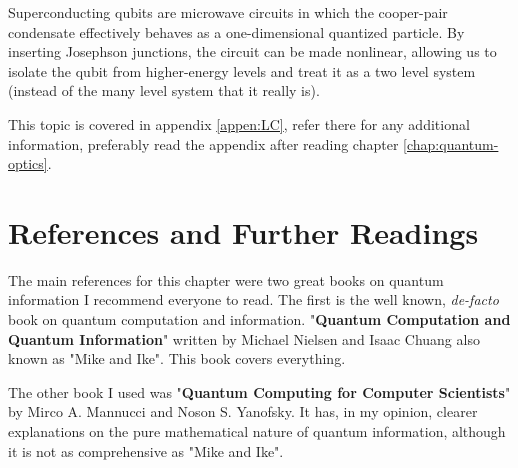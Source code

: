 Superconducting qubits are microwave circuits in which the cooper-pair condensate effectively behaves as a one-dimensional quantized particle. By inserting Josephson junctions, the circuit can be made nonlinear, allowing us to isolate the qubit from higher-energy levels and treat it as a two level system (instead of the many level system that it really is).

This topic is covered in appendix \ref{appen:LC}, refer there for any additional information, preferably read the appendix after reading chapter \ref{chap:quantum-optics}.

\section{References and Further Readings}
The main references for this chapter were two great books on quantum information I recommend everyone to read. The first is the well known, \textit{de-facto} book on quantum computation and information. "\textbf{Quantum Computation and Quantum Information}" written by Michael Nielsen and Isaac Chuang also known as "Mike and Ike". This book covers everything.

The other book I used was "\textbf{Quantum Computing for Computer Scientists}" by Mirco A. Mannucci and Noson S. Yanofsky. It has, in my opinion, clearer explanations on the pure mathematical nature of quantum information, although it is not as comprehensive as "Mike and Ike".